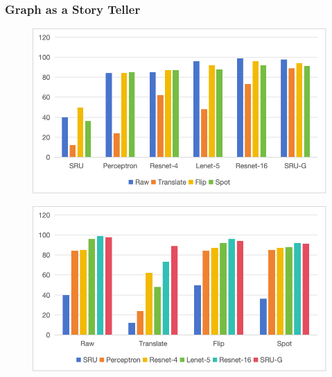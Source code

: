 \documentclass{beamer}
\begin{document}
    \begin{frame}
        \frametitle{Graph as a Story Teller}
        \begin{minipage}{0.48\textwidth}
            \begin{figure}
                \centering
                \includegraphics[width=\textwidth]{fig-1.png}
            \end{figure}
        \end{minipage}
        \hfill
        \begin{minipage}{0.48\textwidth}
            \begin{figure}
                \centering
                \includegraphics[width=\textwidth]{fig-2.png}
            \end{figure}
        \end{minipage}
    \end{frame}
    
\end{document}
